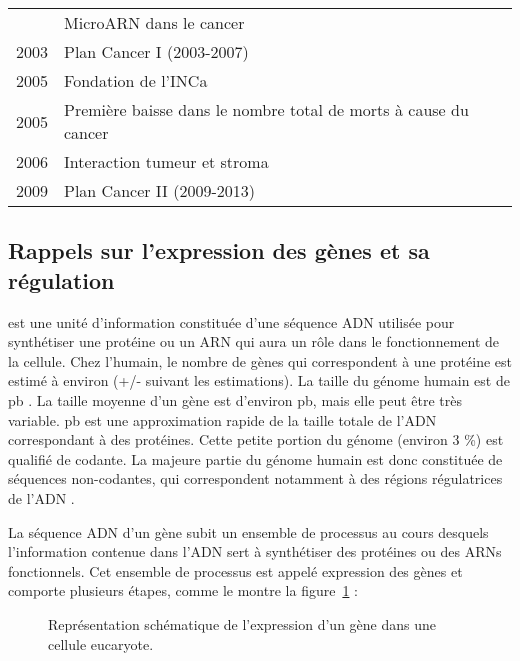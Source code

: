 \begin{table}
\begin{center}
\begin{tabular}{cl}
                          & MicroARN dans le cancer                                                                 \\
            2003          & Plan Cancer I (2003-2007)                                                               \\
            2005          & Fondation de l'\ac{INCa}                                                                \\
            2005          & Première baisse dans le nombre total de morts à cause du cancer                         \\
            2006          & Interaction tumeur et stroma                                                            \\
            2009          & Plan Cancer II (2009-2013)                                                              \\
            \bottomrule
          \end{tabular}
          \label{tab:Devita2012}
        \end{center}
      \end{table}

    \subsection{\textcolor{myred}{Rappels sur l'expression des gènes et sa régulation}}\label{Expression}
       est une unité d'information constituée d'une séquence \acs{ADN} utilisée pour synthétiser une protéine ou un \acs{ARN} qui aura un rôle dans le fonctionnement de la cellule.
      Chez l'humain, le nombre de gènes qui correspondent à une protéine est estimé à environ  \citep{HGP2001} (+/-  suivant les estimations).
      La taille du génome humain est de  \ac{pb} \citep{HGP2001}.
      La taille moyenne d'un gène est d'environ  \ac{pb}, mais elle peut être très variable.
       \ac{pb} est une approximation rapide de la taille totale de l'\acs{ADN} correspondant à des protéines.
      Cette petite portion du génome (environ 3 \%) est qualifié de codante.
      La majeure partie du génome humain est donc constituée de séquences non-codantes, qui correspondent notamment à des régions régulatrices de l'ADN \citep{ENCODE2012}.

      La séquence \acs{ADN} d'un gène subit un ensemble de processus au cours desquels l'information contenue dans l'\acs{ADN} sert à synthétiser des protéines ou des \acsp{ARN} fonctionnels.
      Cet ensemble de processus est appelé expression des gènes et comporte plusieurs étapes, comme le montre la figure~\ref{fig:Expression} :
      \begin{figure}
        \begin{center}
          \def\svgwidth{.8\columnwidth}
          \caption{Représentation schématique de l'expression d'un gène dans une cellule eucaryote.}
          \label{fig:Expression}
        \end{center}
      \end{figure}

